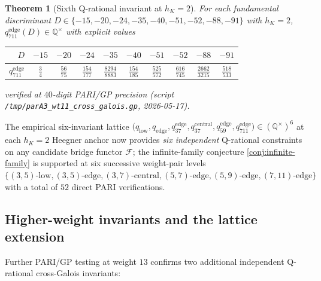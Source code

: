 \documentclass[11pt]{amsart}
\newtheorem{theorem}{Theorem}
\theoremstyle{definition}
\theoremstyle{remark}
\newcommand{\Q}{\mathbb{Q}}
\begin{document}
\begin{theorem}[Sixth Q-rational invariant at $h_K = 2$]\label{thm:six-invariant}
For each fundamental discriminant
$D \in \{-15, -20, -24, -35, -40, -51, -52, -88, -91\}$ with $h_K = 2$,
$q_{711}^{\mathrm{edge}}(D) \in \Q^\times$ with explicit values
\begin{center}
\begin{tabular}{rccccccccc}
\toprule
$D$ & $-15$ & $-20$ & $-24$ & $-35$ & $-40$ & $-51$ & $-52$ & $-88$ & $-91$\\
\midrule
$q_{711}^{\mathrm{edge}}$
  & $\frac{3}{4}$ & $\frac{56}{75}$ & $\frac{154}{177}$ & $\frac{8294}{8883}$
  & $\frac{154}{185}$ & $\frac{525}{572}$ & $\frac{616}{745}$
  & $\frac{2662}{3215}$ & $\frac{518}{533}$\\
\bottomrule
\end{tabular}
\end{center}
verified at $40$-digit PARI/GP precision (script
\verb|/tmp/parA3_wt11_cross_galois.gp|, 2026-05-17).
\end{theorem}

The empirical six-invariant lattice
$\bigl(q_{\mathrm{low}}, q_{\mathrm{edge}}, q_{37}^{\mathrm{edge}},
q_{37}^{\mathrm{central}}, q_{59}^{\mathrm{edge}}, q_{711}^{\mathrm{edge}}\bigr)
\in (\Q^\times)^6$ at each $h_K=2$ Heegner anchor now provides
\emph{six independent} Q-rational constraints on any candidate
bridge functor $\mathcal{F}$; the infinite-family conjecture
\ref{conj:infinite-family} is supported at six successive weight-pair
levels $\{(3,5)\text{-low}, (3,5)\text{-edge}, (3,7)\text{-central},
(5,7)\text{-edge}, (5,9)\text{-edge}, (7,11)\text{-edge}\}$ with a
total of $52$ direct PARI verifications.

\subsection{Higher-weight invariants and the lattice extension}
\label{ss:wt13-extension}

Further PARI/GP testing at weight $13$ confirms two additional
independent Q-rational cross-Galois invariants:
\end{document}
